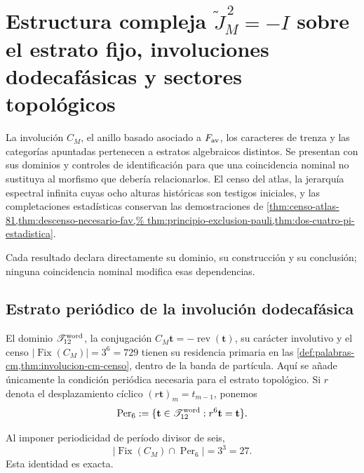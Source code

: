 \chapter[Estructura compleja \texorpdfstring{\(\widetilde J_M^{\,2}=-I\)}{J M al cuadrado = -I} y sectores topológicos]
{Estructura compleja \texorpdfstring{\(\widetilde J_M^{\,2}=-I\)}{J M al cuadrado = -I} sobre el estrato fijo, involuciones dodecafásicas y sectores topológicos}
\label{chap:sectores-topologicos-no-omision}

La involución \(C_M\), el anillo basado asociado a \(F_{\rm av}\), los
caracteres de trenza y las categorías apuntadas pertenecen a estratos
algebraicos distintos. Se presentan con sus dominios y controles de
identificación para que una coincidencia nominal no sustituya al morfismo que
debería relacionarlos. El censo del atlas, la jerarquía espectral infinita
cuyas ocho alturas históricas son testigos iniciales, y las completaciones
estadísticas conservan las demostraciones de
\cref{thm:censo-atlas-81,thm:descenso-necesario-fav,%
thm:principio-exclusion-pauli,thm:dos-cuatro-pi-estadistica}.

Cada resultado declara directamente su dominio, su construcción y su
conclusión; ninguna coincidencia nominal modifica esas dependencias.

\section{Estrato periódico de la involución dodecafásica}
\label{sec:involucion-cm-censo}

El dominio \(\mathscr T_{12}^{\rm word}\), la conjugación
\(C_M\mathbf t=-\operatorname{rev}(\mathbf t)\), su carácter involutivo y el
censo \(\lvert\operatorname{Fix}(C_M)\rvert=3^6=729\) tienen su residencia
primaria en las
\cref{def:palabras-cm,thm:involucion-cm-censo}, dentro de la banda de
partícula. Aquí se añade únicamente la condición periódica necesaria para el
estrato topológico. Si \(r\) denota el desplazamiento cíclico
\((r\mathbf t)_m=t_{m-1}\), ponemos
\[
 \operatorname{Per}_6
 :=\{\mathbf t\in\mathscr T_{12}^{\rm word}:r^6\mathbf t=\mathbf t\}.
\]

\begin{proposition}
\label{prop:estrato-periodico-cm-rev7}
Al imponer periodicidad de período divisor de seis,
\[
 \bigl|\operatorname{Fix}(C_M)\cap\operatorname{Per}_6\bigr|
 =3^3=27.
\]
Esta identidad es exacta.
\end{proposition}

